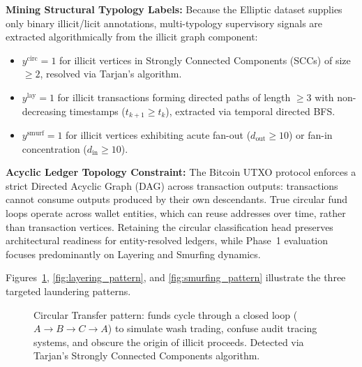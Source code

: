 \vspace{0.5em}
\noindent \textbf{Mining Structural Typology Labels:} Because the Elliptic dataset supplies only binary illicit/licit annotations, multi-typology supervisory signals are extracted algorithmically from the illicit graph component:
\begin{itemize}
	\item $y^{\text{circ}} = 1$ for illicit vertices in Strongly Connected Components (SCCs) of size $\geq 2$, resolved via Tarjan's algorithm.
	\item $y^{\text{lay}} = 1$ for illicit transactions forming directed paths of length $\geq 3$ with non-decreasing timestamps ($t_{k+1} \geq t_k$), extracted via temporal directed BFS.
	\item $y^{\text{smurf}} = 1$ for illicit vertices exhibiting acute fan-out ($d_{\text{out}} \geq 10$) or fan-in concentration ($d_{\text{in}} \geq 10$).
\end{itemize}

\noindent \textbf{Acyclic Ledger Topology Constraint:} The Bitcoin UTXO protocol enforces a strict Directed Acyclic Graph (DAG) across transaction outputs: transactions cannot consume outputs produced by their own descendants. True circular fund loops operate across wallet entities, which can reuse addresses over time, rather than transaction vertices. Retaining the circular classification head preserves architectural readiness for entity-resolved ledgers, while Phase~1 evaluation focuses predominantly on Layering and Smurfing dynamics.

\vspace{1em}
\noindent Figures~\ref{fig:circular_pattern}, \ref{fig:layering_pattern}, and \ref{fig:smurfing_pattern} illustrate the three targeted laundering patterns.

\begin{figure}[!htbp]
\centering
{}
\caption[Circular Transfer Pattern]{Circular Transfer pattern: funds cycle through a closed loop ($A \to B \to C \to A$) to simulate wash trading, confuse audit tracing systems, and obscure the origin of illicit proceeds. Detected via Tarjan's Strongly Connected Components algorithm.}
\label{fig:circular_pattern}
\end{figure}

